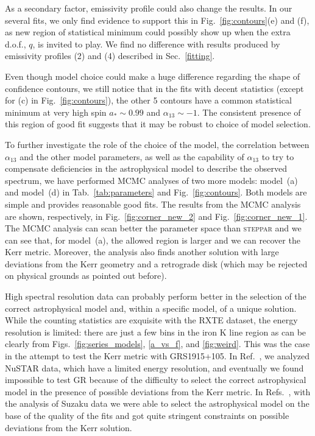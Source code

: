 \documentclass[11pt,a4paper,pdftex]{article}
\begin{document}
As a secondary factor, emissivity profile could also change the results. In our several fits, we only find evidence to support this in Fig.~\ref{fig:contours}(e) and (f), as new region of statistical minimum could possibly show up when the extra d.o.f., $q$, is invited to play. We find no difference with results produced by emissivity profiles (2) and (4) described in Sec.~\ref{fitting}. 


Even though model choice could make a huge difference regarding the shape of confidence contours, we still notice that in the fits with decent statistics (except for (c) in Fig.~\ref{fig:contours}), the other 5 contours have a common statistical minimum at very high spin $a_*\sim0.99$ and $\alpha_{13}\sim-1$. The consistent presence of this region of good fit suggests that it may be robust to choice of model selection. 


To further investigate the role of the choice of the model, the correlation between $\alpha_{13}$ and the other model parameters, as well as the capability of $\alpha_{13}$ to try to compensate deficiencies in the astrophysical model to describe the observed spectrum, we have performed MCMC analyses of two more models: model~(a) and model~(d) in Tab.~\ref{tab:parameters} and Fig.~\ref{fig:contours}. Both models are simple and provides reasonable good fits. The results from the MCMC analysis are shown, respectively, in Fig.~\ref{fig:corner_new_2} and Fig.~\ref{fig:corner_new_1}. The MCMC analysis can scan better the parameter space than \textsc{steppar} and we can see that, for model~(a), the allowed region is larger and we can recover the Kerr metric. Moreover, the analysis also finds another solution with large deviations from the Kerr geometry and a retrograde disk (which may be rejected on physical grounds as pointed out before).


High spectral resolution data can probably perform better in the selection of the correct astrophysical model and, within a specific model, of a unique solution. While the counting statistics are exquisite with the RXTE dataset, the energy resolution is limited: there are just a few bins in the iron K line region as can be clearly from Figs.~\ref{fig:series_models}, \ref{a_vs_f}, and \ref{fig:weird}. This was the case in the attempt to test the Kerr metric with GRS1915+105. In Ref.~\cite{zhang2019kerr}, we analyzed NuSTAR data, which have a limited energy resolution, and eventually we found impossible to test GR because of the difficulty to select the correct astrophysical model in the presence of possible deviations from the Kerr metric. In Refs.~\cite{zhang19nk}, with the analysis of Suzaku data we were able to select the astrophysical model on the base of the quality of the fits and got quite stringent constraints on possible deviations from the Kerr solution. 
\end{document}
